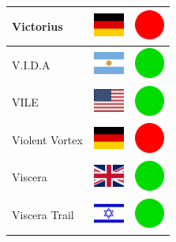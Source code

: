 \documentclass[12pt, a4paper, twoside]{report}
\begin{document}
\begin{center}
\begin{longtable}{|p{5cm}|p{2cm}|p{2cm}|}
 Victorius                                                  & \includegraphics[width=1cm]{../img/flags/de} &   \includegraphics[width=1cm]{../likes/n} \\ \hline
 V.I.D.A                                                    & \includegraphics[width=1cm]{../img/flags/ar} &   \includegraphics[width=1cm]{../likes/y} \\ \hline
 VILE                                                       & \includegraphics[width=1cm]{../img/flags/us} &   \includegraphics[width=1cm]{../likes/y} \\ \hline
 Violent Vortex                                             & \includegraphics[width=1cm]{../img/flags/de} &   \includegraphics[width=1cm]{../likes/n} \\ \hline
 Viscera                                                    & \includegraphics[width=1cm]{../img/flags/gb} &   \includegraphics[width=1cm]{../likes/y} \\ \hline
 Viscera Trail                                              & \includegraphics[width=1cm]{../img/flags/il} &   \includegraphics[width=1cm]{../likes/y} \\ \hline

\end{longtable}
\end{center}
\end{document}
